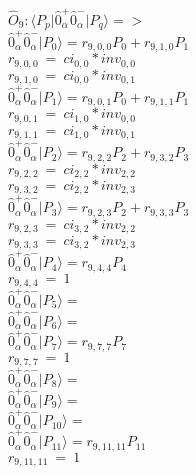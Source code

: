 \documentclass[14pt]{article}
\begin{document}
    $\hat{O}_{9}:  \langle{P_p}\vert \hat{0}_{\alpha}^{+}\hat{0}_{\alpha}^{-} \vert{P_q}\rangle => $ \\ 
    $ \hat{0}_{\alpha}^{+}\hat{0}_{\alpha}^{-} \vert{P_{0}}\rangle = {r}_{9,0,0}P_{0}+{r}_{9,1,0}P_{1} $ \\ 
    ${r}_{9,0,0}\ =\ {ci}_{0,0}*{inv}_{0,0} $ \\ 
    ${r}_{9,1,0}\ =\ {ci}_{0,0}*{inv}_{0,1} $ \\ 
    $ \hat{0}_{\alpha}^{+}\hat{0}_{\alpha}^{-} \vert{P_{1}}\rangle = {r}_{9,0,1}P_{0}+{r}_{9,1,1}P_{1} $ \\ 
    ${r}_{9,0,1}\ =\ {ci}_{1,0}*{inv}_{0,0} $ \\ 
    ${r}_{9,1,1}\ =\ {ci}_{1,0}*{inv}_{0,1} $ \\ 
    $ \hat{0}_{\alpha}^{+}\hat{0}_{\alpha}^{-} \vert{P_{2}}\rangle = {r}_{9,2,2}P_{2}+{r}_{9,3,2}P_{3} $ \\ 
    ${r}_{9,2,2}\ =\ {ci}_{2,2}*{inv}_{2,2} $ \\ 
    ${r}_{9,3,2}\ =\ {ci}_{2,2}*{inv}_{2,3} $ \\ 
    $ \hat{0}_{\alpha}^{+}\hat{0}_{\alpha}^{-} \vert{P_{3}}\rangle = {r}_{9,2,3}P_{2}+{r}_{9,3,3}P_{3} $ \\ 
    ${r}_{9,2,3}\ =\ {ci}_{3,2}*{inv}_{2,2} $ \\ 
    ${r}_{9,3,3}\ =\ {ci}_{3,2}*{inv}_{2,3} $ \\ 
    $ \hat{0}_{\alpha}^{+}\hat{0}_{\alpha}^{-} \vert{P_{4}}\rangle = {r}_{9,4,4}P_{4} $ \\ 
    ${r}_{9,4,4}\ =\ 1 $ \\ 
    $ \hat{0}_{\alpha}^{+}\hat{0}_{\alpha}^{-} \vert{P_{5}}\rangle =  $ \\ 
    $ \hat{0}_{\alpha}^{+}\hat{0}_{\alpha}^{-} \vert{P_{6}}\rangle =  $ \\ 
    $ \hat{0}_{\alpha}^{+}\hat{0}_{\alpha}^{-} \vert{P_{7}}\rangle = {r}_{9,7,7}P_{7} $ \\ 
    ${r}_{9,7,7}\ =\ 1 $ \\ 
    $ \hat{0}_{\alpha}^{+}\hat{0}_{\alpha}^{-} \vert{P_{8}}\rangle =  $ \\ 
    $ \hat{0}_{\alpha}^{+}\hat{0}_{\alpha}^{-} \vert{P_{9}}\rangle =  $ \\ 
    $ \hat{0}_{\alpha}^{+}\hat{0}_{\alpha}^{-} \vert{P_{10}}\rangle =  $ \\ 
    $ \hat{0}_{\alpha}^{+}\hat{0}_{\alpha}^{-} \vert{P_{11}}\rangle = {r}_{9,11,11}P_{11} $ \\ 
    ${r}_{9,11,11}\ =\ 1 $ \\ 
\end{document}
